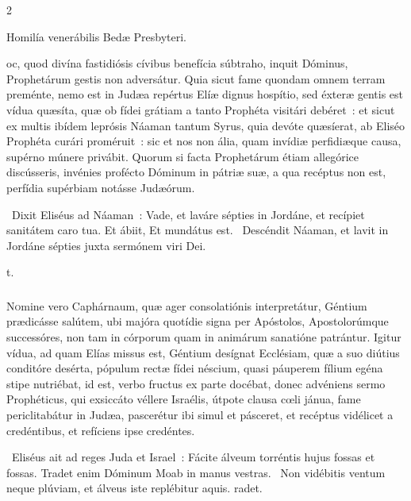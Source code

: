 \documentclass[9pt,twoside]{extarticle}
\begin{document}
\begin{multicols}{2}
{\begin{center}Homilía venerábilis Bedæ Presbyteri.\\
\end{center}
oc, quod divína fastidiósis cívibus benefícia súbtraho, inquit Dóminus, Prophetárum gestis non adversátur. Quia sicut fame quondam omnem terram preménte, nemo est in Judæa repértus Elíæ dignus hospítio, sed éxteræ gentis est vídua quæsíta, quæ ob fídei grátiam a tanto Prophéta visitári debéret~: et sicut ex multis ibídem leprósis Náaman tantum Syrus, quia devóte quæsíerat, ab Eliséo Prophéta curári proméruit~: sic et nos non ália, quam invídiæ perfidiæque causa, supérno múnere privábit. Quorum si facta Prophetárum étiam allegórice discússeris, invénies profécto Dóminum in pátriæ suæ, a qua recéptus non est, perfídia supérbiam notásse Judæórum.

\begin{tightlist}{}
\item {}~Dixit Eliséus ad Náaman~: Vade, et laváre sépties in Jordáne, et recípiet sanitátem caro tua. Et ábiit, \textred{*} Et mundátus est. ~Descéndit Náaman, et lavit in Jordáne sépties juxta sermónem viri Dei. \item {}t.
\end{tightlist}

\subsubsection*{\center {}}
\lettrine{N}omine vero Caphárnaum, quæ ager consolatiónis interpretátur, Géntium prædicásse salútem, ubi majóra quotídie signa per Apóstolos, Apostolorúmque successóres, non tam in córporum quam in animárum sanatióne patrántur. Igitur vídua, ad quam Elías missus est, Géntium desígnat Ecclésiam, quæ a suo diútius conditóre desérta, pópulum rectæ fídei néscium, quasi páuperem fílium egéna stipe nutriébat, id est, verbo fructus ex parte docébat, donec advéniens sermo Prophéticus, qui exsiccáto véllere Israélis, útpote clausa cœli jánua, fame periclitabátur in Judæa, pascerétur ibi simul et pásceret, et recéptus vidélicet a credéntibus, et refíciens ipse credéntes.

\begin{tightlist}{}
\item {}~Eliséus ait ad reges Juda et Israel~: Fácite álveum torréntis hujus fossas et fossas. \textred{*} Tradet enim Dóminum Moab in manus vestras. ~Non vidébitis ventum neque plúviam, et álveus iste replébitur aquis. radet.
\item {}
\end{tightlist}

}
\end{multicols}
\end{document}
